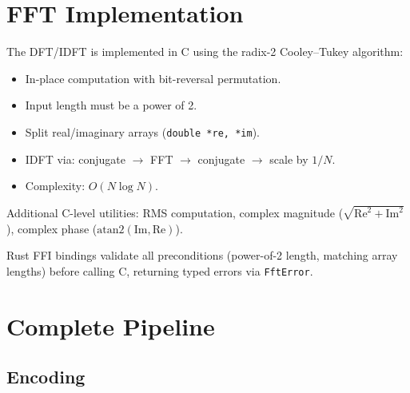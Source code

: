 \documentclass[11pt,a4paper]{article}
\begin{document}
\section{FFT Implementation}
\label{sec:fft}

The DFT/IDFT is implemented in C using the radix-2 Cooley--Tukey algorithm:

\begin{itemize}
    \item In-place computation with bit-reversal permutation.
    \item Input length must be a power of 2.
    \item Split real/imaginary arrays (\texttt{double *re, *im}).
    \item IDFT via: conjugate $\to$ FFT $\to$ conjugate $\to$ scale by $1/N$.
    \item Complexity: $O(N \log N)$.
\end{itemize}

Additional C-level utilities: RMS computation, complex magnitude
($\sqrt{\mathrm{Re}^2 + \mathrm{Im}^2}$), complex phase
($\mathrm{atan2}(\mathrm{Im}, \mathrm{Re})$).

Rust FFI bindings validate all preconditions (power-of-2 length,
matching array lengths) before calling C, returning typed errors
via \texttt{FftError}.


\section{Complete Pipeline}
\label{sec:pipeline}

\subsection{Encoding}
\end{document}
